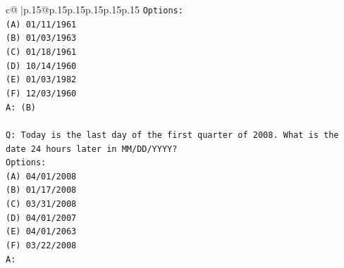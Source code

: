 \documentclass{article}
\begin{document}
{\begin{supertabular}{c@{$\;$}|p{.15\linewidth}@{}p{.15\linewidth}p{.15\linewidth}p{.15\linewidth}p{.15\linewidth}p{.15\linewidth}}
{{{\texttt{Options:} \\
\texttt{(A) 01/11/1961} \\
\texttt{(B) 01/03/1963} \\
\texttt{(C) 01/18/1961} \\
\texttt{(D) 10/14/1960} \\
\texttt{(E) 01/03/1982} \\
\texttt{(F) 12/03/1960} \\
\texttt{A: (B)} \\
\\ 
\texttt{Q: Today is the last day of the first quarter of 2008. What is the date 24 hours later in MM/DD/YYYY?} \\
\texttt{Options:} \\
\texttt{(A) 04/01/2008} \\
\texttt{(B) 01/17/2008} \\
\texttt{(C) 03/31/2008} \\
\texttt{(D) 04/01/2007} \\
\texttt{(E) 04/01/2063} \\
\texttt{(F) 03/22/2008} \\
\texttt{A:} \\
            }
        }
    }
     \\ \\


\end{supertabular}}
\end{document}
